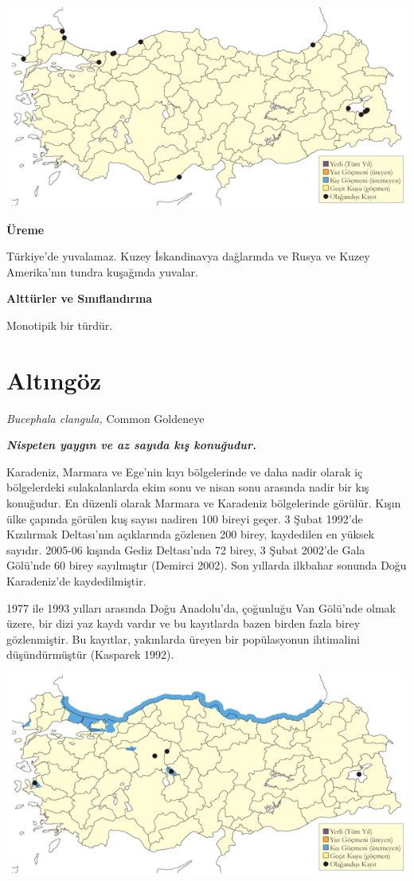 \documentclass[
  letterpaper,
  DIV=11,
  numbers=noendperiod]{scrreprt}
\begin{document}
\includegraphics{images/harita_Page_030.png}

\textbf{Üreme}

Türkiye'de yuvalamaz. Kuzey İskandinavya dağlarında ve Rusya ve Kuzey
Amerika'nın tundra kuşağında yuvalar.

\textbf{Alttürler ve Sınıflandırma}

Monotipik bir türdür.

\section{Altıngöz}\label{altux131nguxf6z}

\emph{Bucephala clangula,} Common Goldeneye

\textbf{\emph{Nispeten yaygın ve az sayıda kış konuğudur.}}

Karadeniz, Marmara ve Ege'nin kıyı bölgelerinde ve daha nadir olarak iç
bölgelerdeki sulakalanlarda ekim sonu ve nisan sonu arasında nadir bir
kış konuğudur. En düzenli olarak Marmara ve Karadeniz bölgelerinde
görülür. Kışın ülke çapında görülen kuş sayısı nadiren 100 bireyi geçer.
3 Şubat 1992'de Kızılırmak Deltası'nın açıklarında gözlenen 200 birey,
kaydedilen en yüksek sayıdır. 2005-06 kışında Gediz Deltası'nda 72
birey, 3 Şubat 2002'de Gala Gölü'nde 60 birey sayılmıştır (Demirci
2002). Son yıllarda ilkbahar sonunda Doğu Karadeniz'de kaydedilmiştir.

1977 ile 1993 yılları arasında Doğu Anadolu'da, çoğunluğu Van Gölü'nde
olmak üzere, bir dizi yaz kaydı vardır ve bu kayıtlarda bazen birden
fazla birey gözlenmiştir. Bu kayıtlar, yakınlarda üreyen bir
popülasyonun ihtimalini düşündürmüştür (Kasparek 1992).

\includegraphics{images/harita_Page_031.png}
\end{document}
